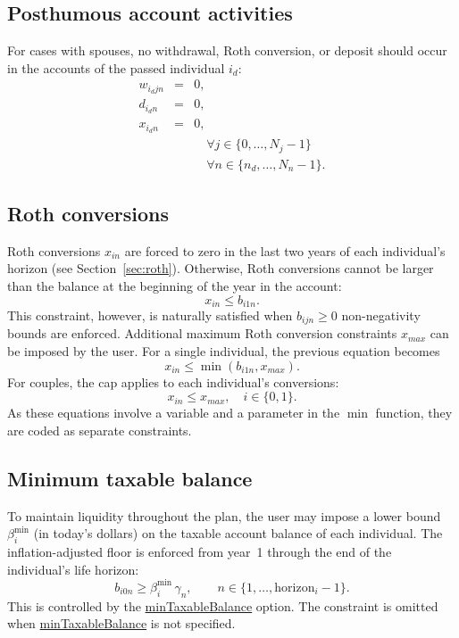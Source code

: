 \documentclass[fleqn,12pt]{report}
\newcommand{\code}[1]{\url{#1}}
\begin{document}
\subsection{Posthumous account activities}
	For cases with spouses, no withdrawal, Roth conversion, or deposit should
	occur in the accounts of the passed individual $i_d$:
	\begin{eqnarray}
		w_{i_djn} &=& 0,\nonumber\\
		d_{i_dn} &=& 0, \nonumber \\
		x_{i_dn} &=& 0, \nonumber \\
		&& \quad \forall j \in \{0, \ldots, N_j-1\} \nonumber \\
		&& \quad \forall n \in \{n_d, \ldots, N_n-1\}.
	\end{eqnarray}

\subsection{Roth conversions}
	Roth conversions $x_{in}$ are forced to zero in the last two years of
	each individual's horizon (see Section~\ref{sec:roth}).
	Otherwise, Roth conversions cannot be larger than the balance at the beginning of the year in the account:
	\begin{equation}
		x_{in} \le b_{i1n}.
	\end{equation}
	This constraint, however, is naturally satisfied when $b_{ijn} \ge 0$ non-negativity bounds are enforced.
	Additional maximum Roth conversion constraints $x_{max}$ can be imposed by the user.
	For a single individual, the previous equation becomes
	\begin{equation}
		x_{in} \le \min(b_{i1n}, x_{max}).
	\end{equation}
	For couples, the cap applies to each individual's conversions:
	\begin{equation}
		x_{in} \le x_{max}, \quad i \in \{0,1\}.
	\end{equation}
	As these equations involve a variable and a parameter in the $\min$ function,
	they are coded as separate constraints.

\subsection{Minimum taxable balance}
	To maintain liquidity throughout the plan, the user may impose a lower
	bound $\beta^{\min}_i$ (in today's dollars) on the taxable account balance
	of each individual.
	The inflation-adjusted floor is enforced from year~1 through the end
	of the individual's life horizon:
	\begin{equation}
		\label{Eq:MinTaxBal}
		b_{i0n} \ge \beta^{\min}_i\,\gamma_n,
		\qquad n \in \{1, \ldots, \mathrm{horizon}_i - 1\}.
	\end{equation}
	This is controlled by the \code{minTaxableBalance} option.
	The constraint is omitted when \code{minTaxableBalance} is not specified.
\end{document}
